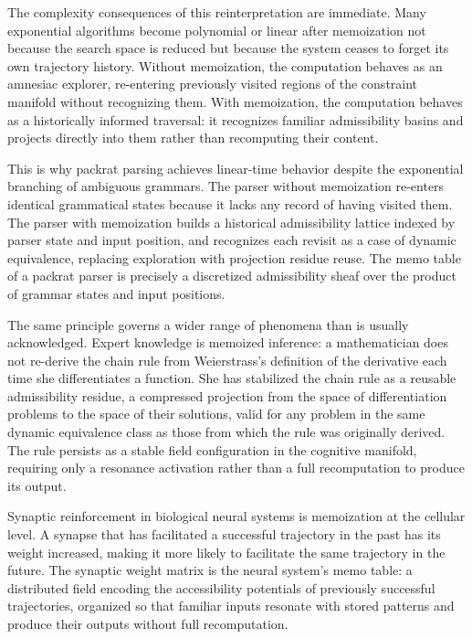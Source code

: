 \documentclass[12pt, a4paper, openany]{book}
\theoremstyle{plain}
\theoremstyle{definition}
\theoremstyle{remark}
\begin{document}
The complexity consequences of this reinterpretation are immediate. Many exponential algorithms become polynomial or linear after memoization not because the search space is reduced but because the system ceases to forget its own trajectory history. Without memoization, the computation behaves as an amnesiac explorer, re-entering previously visited regions of the constraint manifold without recognizing them. With memoization, the computation behaves as a historically informed traversal: it recognizes familiar admissibility basins and projects directly into them rather than recomputing their content.

This is why packrat parsing achieves linear-time behavior despite the exponential branching of ambiguous grammars. The parser without memoization re-enters identical grammatical states because it lacks any record of having visited them. The parser with memoization builds a historical admissibility lattice indexed by parser state and input position, and recognizes each revisit as a case of dynamic equivalence, replacing exploration with projection residue reuse. The memo table of a packrat parser is precisely a discretized admissibility sheaf over the product of grammar states and input positions.

The same principle governs a wider range of phenomena than is usually acknowledged. Expert knowledge is memoized inference: a mathematician does not re-derive the chain rule from Weierstrass's definition of the derivative each time she differentiates a function. She has stabilized the chain rule as a reusable admissibility residue, a compressed projection from the space of differentiation problems to the space of their solutions, valid for any problem in the same dynamic equivalence class as those from which the rule was originally derived. The rule persists as a stable field configuration in the cognitive manifold, requiring only a resonance activation rather than a full recomputation to produce its output.

Synaptic reinforcement in biological neural systems is memoization at the cellular level. A synapse that has facilitated a successful trajectory in the past has its weight increased, making it more likely to facilitate the same trajectory in the future. The synaptic weight matrix is the neural system's memo table: a distributed field encoding the accessibility potentials of previously successful trajectories, organized so that familiar inputs resonate with stored patterns and produce their outputs without full recomputation.
\end{document}
